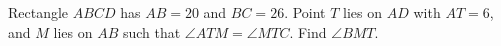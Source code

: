 Rectangle $ABCD$ has $AB=20$ and $BC=26$. Point $T$ lies on $AD$ with $AT=6$, and $M$ lies on $AB$ such that $\angle ATM=\angle MTC$. Find $\angle BMT$.

